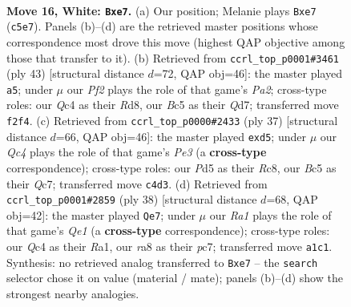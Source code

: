 \documentclass[11pt]{article}
\begin{document}
\clearpage

\begin{figure}[p]\centering
\begin{subfigure}{0.46\textwidth}\centering
\resizebox{\linewidth}{!}{%
\newchessgame
\chessboard[
  setfen={rn3rk1/p1p1pp1p/6p1/2BP4/2Q1P3/2b4q/P4P1P/R4RK1 w - - 0 16},
  showmover=false,
  pgfstyle=straightmove, color=movearrow, markmove={c5-e7}
]}
\caption{}
\end{subfigure}\hfill
\begin{subfigure}{0.46\textwidth}\centering
\resizebox{\linewidth}{!}{%
\newchessgame
\chessboard[
  setfen={3rr1k1/pp1q2p1/2p2p1p/5P1Q/3P3N/6Pb/PP3P1P/3RR1K1 b - - 2 22},
  showmover=false,
  pgfstyle=straightmove, color=movearrow, markmove={a7-a5}
]}
\caption{}
\end{subfigure}
\\[4pt]
\begin{subfigure}{0.46\textwidth}\centering
\resizebox{\linewidth}{!}{%
\newchessgame
\chessboard[
  setfen={2r2rk1/p1q2ppp/1p2p3/3BP3/8/Q1P3P1/P4P1P/2RR2K1 b - - 0 19},
  showmover=false,
  pgfstyle=straightmove, color=movearrow, markmove={e6-d5}
]}
\caption{}
\end{subfigure}\hfill
\begin{subfigure}{0.46\textwidth}\centering
\resizebox{\linewidth}{!}{%
\newchessgame
\chessboard[
  setfen={r1b2rk1/2p2ppp/2p5/p7/2q5/2P2B2/PP3PP1/R3QRK1 w - - 0 20},
  showmover=false,
  pgfstyle=straightmove, color=movearrow, markmove={e1-e7}
]}
\caption{}
\end{subfigure}
\caption{\textbf{Move 16, White: \texttt{Bxe7}.} (a) Our position; Melanie plays \texttt{Bxe7} (\texttt{c5e7}). Panels (b)--(d) are the retrieved master positions whose correspondence most drove this move (highest QAP objective among those that transfer to it). (b) Retrieved from \texttt{ccrl\_top\_p0001\#3461} (ply 43) [structural distance $d$=72, QAP obj=46]: the master played \texttt{a5}; under $\mu$ our \emph{Pf2} plays the role of that game's \emph{Pa2}; cross-type roles: our \emph{Q}c4 as their \emph{R}d8, our \emph{B}c5 as their \emph{Q}d7; transferred move \texttt{f2f4}. (c) Retrieved from \texttt{ccrl\_top\_p0000\#2433} (ply 37) [structural distance $d$=66, QAP obj=46]: the master played \texttt{exd5}; under $\mu$ our \emph{Qc4} plays the role of that game's \emph{Pe3} (a \textbf{cross-type} correspondence); cross-type roles: our \emph{P}d5 as their \emph{R}c8, our \emph{B}c5 as their \emph{Q}c7; transferred move \texttt{c4d3}. (d) Retrieved from \texttt{ccrl\_top\_p0001\#2859} (ply 38) [structural distance $d$=68, QAP obj=42]: the master played \texttt{Qe7}; under $\mu$ our \emph{Ra1} plays the role of that game's \emph{Qe1} (a \textbf{cross-type} correspondence); cross-type roles: our \emph{Q}c4 as their \emph{R}a1, our \emph{r}a8 as their \emph{p}c7; transferred move \texttt{a1c1}. Synthesis: no retrieved analog transferred to \texttt{Bxe7} -- the \texttt{search} selector chose it on value (material / mate); panels (b)--(d) show the strongest nearby analogies.}
\label{fig:thought-m30}
\end{figure}
\end{document}

